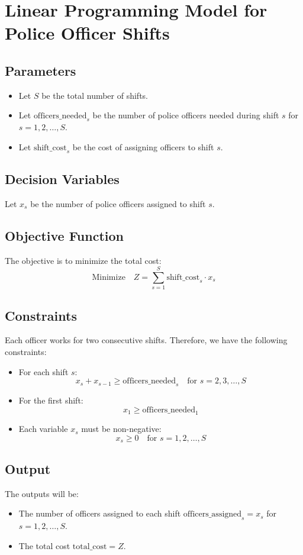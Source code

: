 \documentclass{article}
\begin{document}
\section*{Linear Programming Model for Police Officer Shifts}

\subsection*{Parameters}
\begin{itemize}
    \item Let \( S \) be the total number of shifts.
    \item Let \( \text{officers\_needed}_{s} \) be the number of police officers needed during shift \( s \) for \( s = 1, 2, \ldots, S \).
    \item Let \( \text{shift\_cost}_{s} \) be the cost of assigning officers to shift \( s \).
\end{itemize}

\subsection*{Decision Variables}
Let \( x_{s} \) be the number of police officers assigned to shift \( s \).

\subsection*{Objective Function}
The objective is to minimize the total cost:
\[
\text{Minimize} \quad Z = \sum_{s=1}^{S} \text{shift\_cost}_{s} \cdot x_{s}
\]

\subsection*{Constraints}
Each officer works for two consecutive shifts. Therefore, we have the following constraints:

\begin{itemize}
    \item For each shift \( s \):
    \[
    x_{s} + x_{s-1} \geq \text{officers\_needed}_{s} \quad \text{for } s = 2, 3, \ldots, S
    \]
    \item For the first shift:
    \[
    x_{1} \geq \text{officers\_needed}_{1}
    \]
    \item Each variable \( x_s \) must be non-negative:
    \[
    x_{s} \geq 0 \quad \text{for } s = 1, 2, \ldots, S
    \]
\end{itemize}

\subsection*{Output}
The outputs will be:
\begin{itemize}
    \item The number of officers assigned to each shift \( \text{officers\_assigned}_{s} = x_{s} \) for \( s = 1, 2, \ldots, S \).
    \item The total cost \( \text{total\_cost} = Z \).
\end{itemize}
\end{document}
